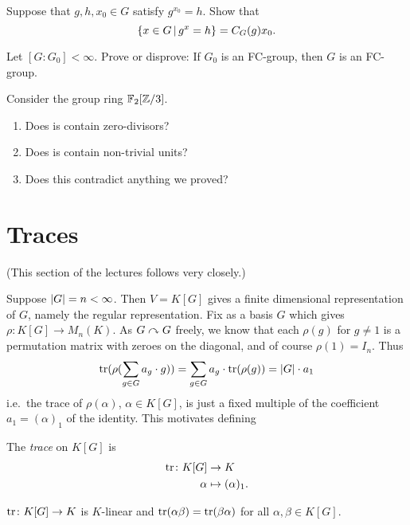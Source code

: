 \begin{exercise}
    Suppose that $g, h, x_0 \in G$ satisfy $g^{x_0} = h$.
    Show that \[
        \left\{ x \in G \,\middle|\, g^x = h \right\} = C_G(g) x_0.
    \]
\end{exercise}

\begin{exercise}
    Let $[G : G_0] < \infty$.
    Prove or disprove: If $G_0$ is an FC-group, then $G$ is an FC-group.
\end{exercise}

\begin{exercise}
    Consider the group ring $\mathbb{F}_2[\mathbb{Z}/3]$.
    \begin{enumerate}
        \item Does is contain zero-divisors?
        \item Does is contain non-trivial units?
        \item Does this contradict anything we proved?
    \end{enumerate}
\end{exercise}

\section{Traces}

(This section of the lectures follows \cite[Chapter 2]{Passman} very closely.)

Suppose $\lvert G \rvert = n < \infty$.
Then $V = K[G]$ gives a finite dimensional representation of $G$, namely the regular representation.
Fix as a basis $G$ which gives $\rho \colon K[G] \to M_n(K)$.
As $G \curvearrowright G$ freely, we know that each $\rho(g)$ for $g \neq 1$ is a permutation matrix with zeroes on the diagonal, and of course $\rho(1) = I_n$.
Thus \[
    \operatorname{tr}(\rho(\sum_{g \in G} a_g \cdot g)) = \sum_{g \in G} a_g \cdot \operatorname{tr}(\rho(g)) = |G| \cdot a_1
\] i.e.\ the trace of $\rho(\alpha)$, $\alpha \in K[G]$, is just a fixed multiple of the coefficient $a_1 = (\alpha)_1$ of the identity.
This motivates defining
\begin{definition}
    The \emph{trace} on $K[G]$ is
    \begin{align*}
        \operatorname{tr} \colon K[G] &\to K \\
                 \alpha &\mapsto (\alpha)_1.
    \end{align*}
\end{definition}

\begin{lemma}
    $\operatorname{tr} \colon K[G] \to K$ is $K$-linear and $\operatorname{tr}(\alpha \beta) = \operatorname{tr}(\beta \alpha)$ for all $\alpha, \beta \in K[G]$.
\end{lemma}

